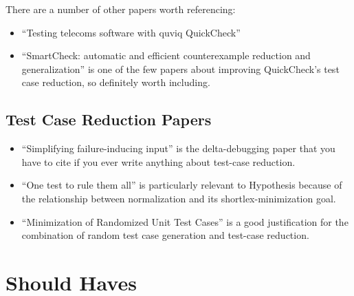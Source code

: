 \begin{enumerate}
There are a number of other papers worth referencing:

\begin{itemize}
\item ``Testing telecoms software with quviq QuickCheck''\cite{DBLP:conf/erlang/ArtsHJW06}
\item ``SmartCheck: automatic and efficient counterexample reduction and generalization''\cite{DBLP:conf/haskell/Pike14} is one of the few papers about improving QuickCheck's test case reduction,
so definitely worth including.
\end{itemize}

\subsection{Test Case Reduction Papers}

\begin{itemize}
\item ``Simplifying failure-inducing input''\cite{DBLP:conf/issta/HildebrandtZ00} is the delta-debugging paper that you have to cite if you ever write anything about test-case reduction.
\item ``One test to rule them all''\cite{DBLP:conf/issta/GroceHK17} is particularly relevant to Hypothesis because of the relationship between normalization and its shortlex-minimization goal.
\item ``Minimization of Randomized Unit Test Cases''\cite{DBLP:conf/issre/LeiA05} is a good justification for the combination of random test case generation and test-case reduction.
\end{itemize}


\section{Should Haves}


\end{enumerate}
